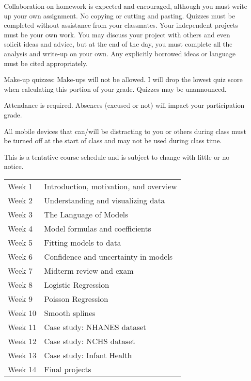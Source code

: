 \documentclass[10pt]{article}
\begin{document}
\bigskip
{}

Collaboration on homework is expected and encouraged, although you must write up your own assignment. No copying or cutting and pasting. Quizzes must be completed without assistance from your classmates. Your independent projects must be your own work. You may discuss your project with others and even solicit ideas and advice, but at the end of the day, you must complete all the analysis and write-up on your own. Any explicitly borrowed ideas or language must be cited appropriately.


Make-up quizzes: Make-ups will not be allowed. I will drop the lowest quiz score when calculating this portion of your grade. Quizzes may be unannounced.

Attendance is required. Absences (excused or not) will impact your participation grade.

All mobile devices that can/will be distracting to you or others during class must be turned off at the start of class and may not be used during class time.
%  
%  

\clearpage


\noindent This is a tentative course schedule and is subject to change with little or no notice.

\begin{table}[htdp]
\begin{tabular}{ll}
Week 1 & Introduction, motivation, and overview \\
Week 2 & Understanding and visualizing data \\
Week 3 & The Language of Models\\
Week 4 & Model formulas and coefficients\\
Week 5 & Fitting models to data\\
Week 6 & Confidence and uncertainty in models\\
Week 7 & Midterm review and exam\\
Week 8 & Logistic Regression\\
Week 9 & Poisson Regression\\
Week 10 & Smooth splines\\
Week 11 & Case study: NHANES dataset\\
Week 12 & Case study: NCHS dataset\\
Week 13 & Case study: Infant Health\\
Week 14 & Final projects
\end{tabular}
\end{table}%
\end{document}
